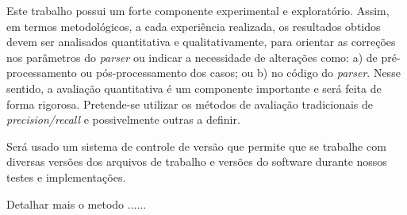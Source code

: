 Este trabalho possui um forte componente experimental e exploratório. Assim, em termos metodológicos, a cada experiência realizada, os resultados obtidos devem ser analisados quantitativa e qualitativamente, para orientar as correções nos parâmetros do \emph{parser} ou indicar a necessidade de alterações como: a) de pré-processamento ou pós-processamento dos casos; ou b) no código do \emph{parser}. Nesse sentido, a avaliação quantitativa é um componente importante e será feita de forma rigorosa. Pretende-se utilizar os métodos de avaliação tradicionais de \emph{precision/recall} \cite{black93} e possivelmente outras a definir.

Será usado um sistema de controle de versão que permite que se trabalhe com diversas versões dos arquivos de trabalho
e  versões do software durante nossos testes e implementações.



Detalhar mais o metodo ......
